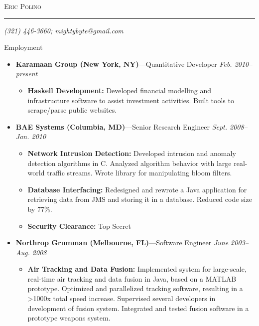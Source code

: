 \documentclass[11pt,oneside]{article}
\makeatletter
\newcommand{\name}{Eric Polino}
\newcommand{\phone}{(321) 446-3660}
\newcommand{\email}{mightybyte@gmail.com}
\newcommand{\bigname}[1]{
	\begin{center}\fontfamily{phv}\selectfont\Huge\scshape#1\end{center}
}
\newenvironment{ressection}[1]{
	\vspace{4pt}
	{\fontfamily{phv}\selectfont\Large#1}
	\begin{itemize}
	\vspace{3pt}
}{
	\end{itemize}
}
\newcommand{\ressubitem}[1]{
	\vspace{-1pt}
	\item \begin{flushleft} #1 \end{flushleft}
}
\newcommand{\resbigitem}[3]{
	\vspace{-5pt}
	\item
	{\textbf{#1}---#2 \hfill \textit{#3}}
}
\newenvironment{restitledposition}[3]{
	\resbigitem{#1}{#2}{#3}
	\vspace{-2pt}
	\begin{itemize}
}{
	\end{itemize}
}
\makeatother
\begin{document}
 \selectfont

\bigname{\name}

\vspace{-8pt} \rule{\textwidth}{1pt}

\vspace{-1pt} {\small\itshape \hfill \phone; \email \hfill}

\vspace{8 pt}




\begin{ressection}{Employment}

	\begin{restitledposition}{Karamaan Group (New York, NY)}{Quantitative
Developer}{Feb. 2010--present}

    \ressubitem{\textbf{Haskell Development:} Developed
    financial modelling and infrastructure software to assist
    investment activities.  Built tools to scrape/parse public websites.}

	\end{restitledposition}

	\begin{restitledposition}{BAE Systems (Columbia, MD)}{Senior Research Engineer}{Sept. 2008--Jan. 2010}

    \ressubitem{\textbf{Network Intrusion Detection:} Developed
    intrusion and anomaly detection algorithms in C.  Analyzed
    algorithm behavior with large real-world traffic streams.  Wrote
    library for manipulating bloom filters.}

    \ressubitem{\textbf{Database Interfacing:} Redesigned and
    rewrote a Java application for retrieving data from JMS and
    storing it in a database.  Reduced code size by 77\%.}

    \ressubitem{\textbf{Security Clearance:} Top Secret}

	\end{restitledposition}

	\begin{restitledposition}{Northrop Grumman (Melbourne, FL)}{Software Engineer}{June 2003--Aug. 2008}

    \ressubitem{\textbf{Air Tracking and Data Fusion:} Implemented
    system for large-scale, real-time air tracking and data fusion in
    Java, based on a MATLAB prototype.  Optimized and parallelized
    tracking software, resulting in a >1000x total speed increase.
    Supervised several developers in development of fusion system.
    Integrated and tested fusion software in a prototype weapons
    system.}


\end{restitledposition}
\end{ressection}
\end{document}
